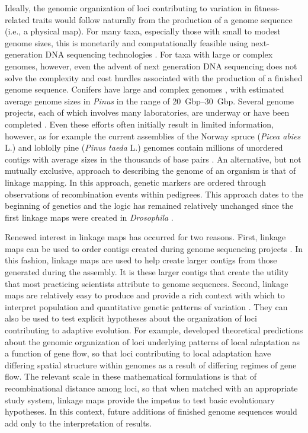 \documentclass[11pt]{article}
\begin{document}
Ideally, the genomic organization of loci contributing to variation in fitness-related traits would follow 
naturally from the production of a genome sequence (i.e., a physical map). For many taxa, especially those with 
small to modest genome sizes, this is monetarily and computationally feasible using next-generation DNA sequencing 
technologies \citep{Koboldt:2013}. For taxa with large or complex genomes, however, even the advent of next generation DNA 
sequencing does not solve the complexity and cost hurdles associated with the production of a finished genome sequence. Conifers 
have large and complex genomes \citep{Murray:1998, Ahuja:2005}, with estimated average genome sizes in \textit{Pinus} in the 
range of \SIrange{20}{30}{Gbp}. Several genome projects, each of which involves many laboratories, are underway or have been 
completed \citep{Mackay:2012}. Even these efforts often initially result in limited information, however,
as for example the current assemblies of the Norway spruce (\textit{Picea abies} L.) and loblolly pine (\textit{Pinus taeda} L.) genomes 
contain millions of unordered contigs with average sizes in the thousands of base pairs \citep{Nystedt:2013}. An alternative, 
but not mutually exclusive, approach to describing the genome of an organism 
is that of linkage mapping. In this approach, genetic markers are ordered through observations of recombination events 
within pedigrees. This approach dates to the beginning of genetics and the logic has remained relatively unchanged 
since the first linkage maps were created in \textit{Drosophila} \citep{Sturtevant:1913}.

Renewed interest in linkage maps has occurred for two reasons. First, linkage maps can be used to order contigs 
created during genome sequencing projects \citep{Mackay:2012, Martinez-Garcia:2013}. In this fashion, linkage 
maps are used to help create larger contigs from those generated during the assembly. It is these larger contigs that 
create the utility that most practicing scientists attribute to genome sequences. Second, linkage maps are relatively 
easy to produce and provide a rich context with which to interpret population and quantitative genetic patterns of variation 
\citep[e.g.,][]{Eckert:2010a, Eckert:2010b, Eckert:2013a, Yeaman:2013}. They can also be used to test explicit hypotheses about 
the organization of loci contributing to adaptive evolution. For example, \citet{Yeaman:2011} developed theoretical 
predictions about the genomic organization of loci underlying patterns of local adaptation as a function of gene flow, 
so that loci contributing to local adaptation have differing spatial structure within genomes as a result of differing 
regimes of gene flow. The relevant scale \citep[\textit{sensu}][]{Houle:2011} in these mathematical formulations is that 
of recombinational distance among loci, so that when matched with an appropriate study system, 
linkage maps provide the impetus to test basic evolutionary hypotheses. In this context, future additions of finished 
genome sequences would add only to the interpretation of results.
\end{document}
